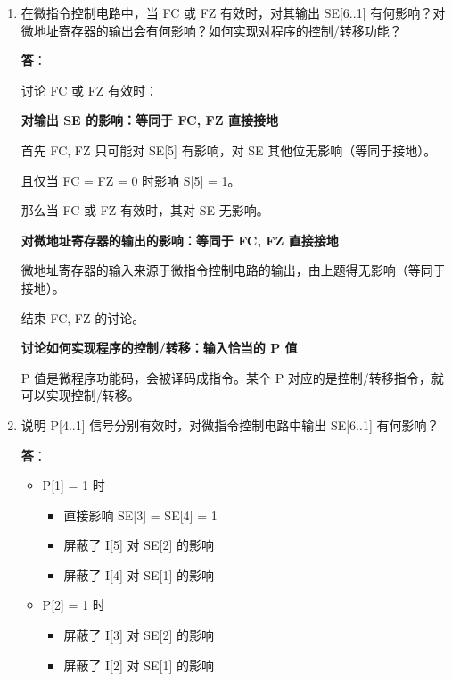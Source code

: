 \begin{enumerate}
    \item 在微指令控制电路中，当 FC 或 FZ 有效时，对其输出 SE[6..1] 有何影响？对微地址寄存器的输出会有何影响？如何实现对程序的控制/转移功能？
    
    \textbf{答}：
    
    讨论 FC 或 FZ 有效时：
    
    \textbf{对输出 SE 的影响：等同于 FC, FZ 直接接地}
    
    首先 FC, FZ 只可能对 SE[5] 有影响，对 SE 其他位无影响（等同于接地）。
    
    且仅当 FC = FZ = 0 时影响 S[5] = 1。
    
    那么当 FC 或 FZ 有效时，其对 SE 无影响。
    
    \textbf{对微地址寄存器的输出的影响：等同于 FC, FZ 直接接地}
    
    微地址寄存器的输入来源于微指令控制电路的输出，由上题得无影响（等同于接地）。

    结束 FC, FZ 的讨论。
    
    \textbf{讨论如何实现程序的控制/转移：输入恰当的 P 值}
    
    P 值是微程序功能码，会被译码成指令。某个 P 对应的是控制/转移指令，就可以实现控制/转移。
    
    \item 说明 P[4..1] 信号分别有效时，对微指令控制电路中输出 SE[6..1] 有何影响？
    
    \textbf{答}：
    
    \begin{itemize}
        \item P[1] = 1 时
        
        \begin{itemize}
            \item 直接影响 SE[3] = SE[4] = 1
            \item 屏蔽了 I[5] 对 SE[2] 的影响
            \item 屏蔽了 I[4] 对 SE[1] 的影响
        \end{itemize}
        
        \item P[2] = 1 时
        
        \begin{itemize}
            \item 屏蔽了 I[3] 对 SE[2] 的影响
            \item 屏蔽了 I[2] 对 SE[1] 的影响            
        \end{itemize}
        

\end{itemize}
\end{enumerate}

